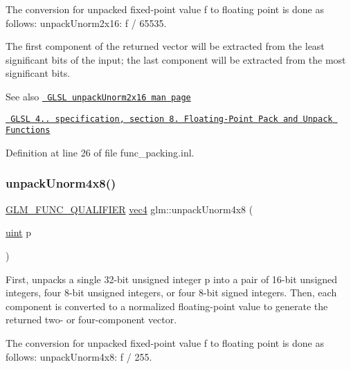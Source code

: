 The conversion for unpacked fixed-\/point value f to floating point is done as follows\+: unpack\+Unorm2x16\+: f / 65535.

The first component of the returned vector will be extracted from the least significant bits of the input; the last component will be extracted from the most significant bits.

\begin{DoxySeeAlso}{See also}
\href{http://www.opengl.org/sdk/docs/manglsl/xhtml/unpackUnorm2x16.xml}{\texttt{ G\+L\+SL unpack\+Unorm2x16 man page}} 

\href{http://www.opengl.org/registry/doc/GLSLangSpec.4.20.8.pdf}{\texttt{ G\+L\+SL 4.. specification, section 8. Floating-\/\+Point Pack and Unpack Functions}} 
\end{DoxySeeAlso}


Definition at line 26 of file func\+\_\+packing.\+inl.

\mbox{\label{group__core__func__packing_ga1ec646af4b27982d175672bddd642792}} 
\subsubsection{\texorpdfstring{unpackUnorm4x8()}{unpackUnorm4x8()}}
{\footnotesize\ttfamily \mbox{\hyperlink{setup_8hpp_a33fdea6f91c5f834105f7415e2a64407}{G\+L\+M\+\_\+\+F\+U\+N\+C\+\_\+\+Q\+U\+A\+L\+I\+F\+I\+ER}} \mbox{\hyperlink{group__core__types_ga5881b1b022d7fd1b7218f5916532dd02}{vec4}} glm\+::unpack\+Unorm4x8 (\begin{DoxyParamCaption}\item[{\mbox{\hyperlink{group__core__precision_ga4fd29415871152bfb5abd588334147c8}{uint}}}]{p }\end{DoxyParamCaption})}

First, unpacks a single 32-\/bit unsigned integer p into a pair of 16-\/bit unsigned integers, four 8-\/bit unsigned integers, or four 8-\/bit signed integers. Then, each component is converted to a normalized floating-\/point value to generate the returned two-\/ or four-\/component vector.

The conversion for unpacked fixed-\/point value f to floating point is done as follows\+: unpack\+Unorm4x8\+: f / 255.

